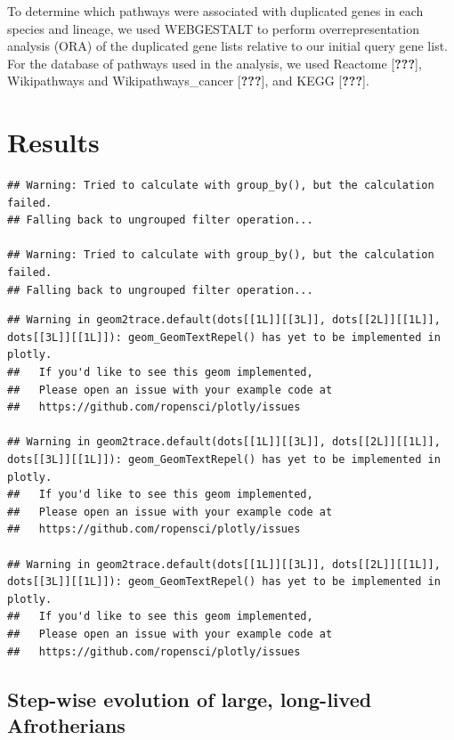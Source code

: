 \documentclass[10pt,letterpaper]{article}
\begin{document}
To determine which pathways were associated with duplicated genes in
each species and lineage, we used WEBGESTALT to perform
overrepresentation analysis (ORA) of the duplicated gene lists relative
to our initial query gene list. For the database of pathways used in the
analysis, we used Reactome {[}{\textbf{???}}{]}, Wikipathways and
Wikipathways\_cancer {[}{\textbf{???}}{]}, and KEGG
{[}{\textbf{???}}{]}.

\hypertarget{results}{%
\section{Results}\label{results}}

\begin{verbatim}
## Warning: Tried to calculate with group_by(), but the calculation failed.
## Falling back to ungrouped filter operation...

## Warning: Tried to calculate with group_by(), but the calculation failed.
## Falling back to ungrouped filter operation...
\end{verbatim}

\begin{verbatim}
## Warning in geom2trace.default(dots[[1L]][[3L]], dots[[2L]][[1L]], dots[[3L]][[1L]]): geom_GeomTextRepel() has yet to be implemented in plotly.
##   If you'd like to see this geom implemented,
##   Please open an issue with your example code at
##   https://github.com/ropensci/plotly/issues

## Warning in geom2trace.default(dots[[1L]][[3L]], dots[[2L]][[1L]], dots[[3L]][[1L]]): geom_GeomTextRepel() has yet to be implemented in plotly.
##   If you'd like to see this geom implemented,
##   Please open an issue with your example code at
##   https://github.com/ropensci/plotly/issues

## Warning in geom2trace.default(dots[[1L]][[3L]], dots[[2L]][[1L]], dots[[3L]][[1L]]): geom_GeomTextRepel() has yet to be implemented in plotly.
##   If you'd like to see this geom implemented,
##   Please open an issue with your example code at
##   https://github.com/ropensci/plotly/issues
\end{verbatim}

\hypertarget{step-wise-evolution-of-large-long-lived-afrotherians}{%
\subsection{Step-wise evolution of large, long-lived
Afrotherians}\label{step-wise-evolution-of-large-long-lived-afrotherians}}
\end{document}
